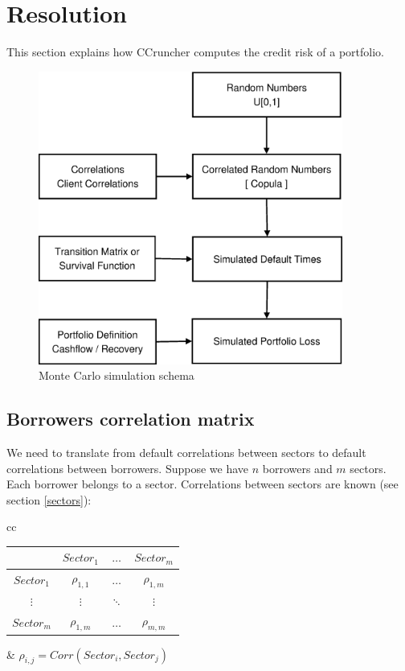 \documentclass[a4paper,12pt,final]{article}
\begin{document}
\clearpage
\section{Resolution}

This section explains how CCruncher computes the credit risk of a portfolio.

\begin{figure}[!hb]
\begin{center}
\includegraphics[width=10cm,angle=0]{./images/esquema1.eps}
\caption{Monte Carlo simulation schema}
\label{fig:mcschema1}
\end{center}
\end{figure}

\subsection{Borrowers correlation matrix}
\label{tcorrel}
We need to translate from default correlations between sectors to default 
correlations between borrowers. Suppose we have $n$ borrowers and $m$ 
sectors. Each borrower belongs to a sector. Correlations between sectors are 
known (see section \ref{sectors}):

\begin{center}
\begin{tabular}[]{cc}
\begin{tabular}[]{c|ccc}
             & $Sector_1$   & $\dots$  & $Sector_{m}$ \\
\hline
$Sector_1$   & $\rho_{1,1}$ & $\dots$  & $\rho_{1,m}$ \\
$\vdots$     & $\vdots$     & $\ddots$ & $\vdots$     \\
$Sector_{m}$ & $\rho_{1,m}$ & $\dots$  & $\rho_{m,m}$ \\
\end{tabular}
&
\qquad $\rho_{i,j} = Corr(Sector_i, Sector_j)$
\end{tabular}
\end{center}
\end{document}
